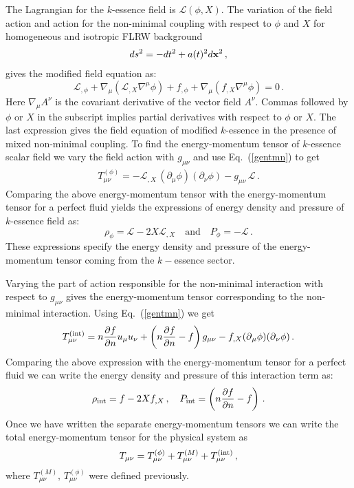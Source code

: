 \documentclass[a4paper,12pt]{article}
\newcommand{\m}{\ensuremath{{\mu \nu}}}
\newcommand{\p}{\ensuremath{\partial{}}}
\begin{document}
The Lagrangian for the $k$-essence field is $\mathcal{L}(\phi, X)$. The variation of the field action and  action for the non-minimal coupling  with respect to $\phi$ and $X$ for homogeneous and isotropic FLRW background
\begin{eqnarray}
ds^2 = -dt^2 +a(t)^2 d{\bf x}^2\,,
\end{eqnarray}  
gives the modified field equation as:
\begin{equation}\label{field equation of kessence}
{\mathcal L}_{,\phi} + \nabla_\mu ({\mathcal L}_{,X} \nabla^\mu \phi)
+ f_{,\phi} + \nabla_\mu (f_{,X} \nabla^\mu \phi)=0\,.
\end{equation}
Here $\nabla_\mu A^\nu$ is the covariant derivative of the vector field $A^\nu$.
Commas followed by $\phi$ or $X$ in the subscript implies partial derivatives with respect to $\phi$ or $X$. The last expression gives the field equation of modified  $k$-essence in the presence of mixed non-minimal coupling. To find the energy-momentum tensor of $k$-essence scalar field we vary the field action with $g_{\m}$ and use Eq.~(\ref{gentmn}) to get
\begin{eqnarray}
T_{\mu \nu}^{(\phi)} = - {\mathcal L}_{,X}\,(\partial_\mu \phi)(\partial_\nu \phi)-g_{\mu \nu}\,{\mathcal L}\,.
\label{tphi}  
\end{eqnarray}
Comparing the above energy-momentum tensor with the energy-momentum tensor for a perfect fluid yields the expressions of energy density and pressure of $k$-essence field as:
\begin{equation}\label{}
\rho_{\phi} = \mathcal{L} - 2X\mathcal{L}_{,X} \quad \text{and} \quad P_{\phi} = - \mathcal{L}\,.
\end{equation}
These expressions specify the energy density and pressure of the energy-momentum tensor coming from the $k-$essence sector. 

Varying the part of action responsible for the non-minimal interaction with respect to $g_{\m}$ gives the energy-momentum tensor corresponding to the non-minimal interaction.  Using Eq.~(\ref{gentmn}) we get
\begin{equation}\label{}
T_{\mu \nu}^{({\rm int})} = n\dfrac{\p f}{\p n} u_{\mu} u_\nu +\left(n\dfrac{\p f}{\p n} -f \right)  g_{\m} - f_{,X}(\p_\mu \phi)(\p_\nu \phi)\,.
\end{equation}
Comparing the above expression with the energy-momentum tensor for a perfect fluid we can write the energy density and pressure of this interaction term as: 
\begin{equation}\label{}
\rho_{\rm int} =f-2X f_{,X}\,,  \quad P_{\rm int} = \left(n\dfrac{\p f}{\p n} -f \right)\,. 
\end{equation}
Once we have written the separate energy-momentum tensors we can write the total energy-momentum tensor for the physical system as
\begin{equation}\label{}
T_{\mu \nu}=T_{\mu \nu}^{(\phi)} + T_{\mu \nu}^{(M)} + T_{\mu \nu}^{({\rm int})}\,,
\end{equation}
where $T_{\mu \nu}^{(M)},\,  T_{\mu \nu}^{(\phi)}$ were defined previously.
\end{document}
